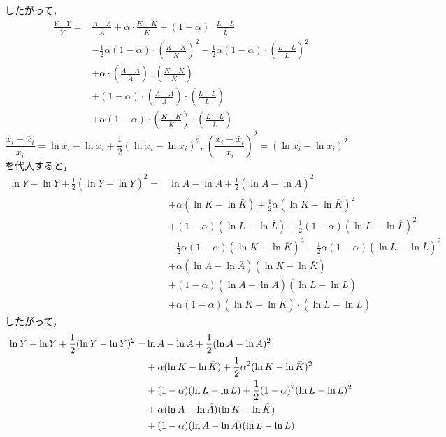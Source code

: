 \documentclass[a4paper,12pt,onecolumn,oneside,notitlepage,final]{article}
\begin{document}
\begin{enumerate}
したがって，
\begin{align*}
\frac{Y - \bar Y}{\bar Y} = &\frac{A-\bar A}{\bar A} + \alpha \cdot \frac{K-\bar K}{\bar K} + (1-\alpha) \cdot \frac{L-\bar L}{\bar L}\\
&-\frac{1}{2} \alpha (1-\alpha) \cdot \left(\frac{K-\bar K}{\bar K}\right)^2 - \frac{1}{2} \alpha(1-\alpha) \cdot \left(\frac{L-\bar L}{\bar L}\right)^2 \\
&+ \alpha \cdot \left(\frac{A - \bar A}{\bar A}\right) \cdot \left(\frac{K- \bar K}{\bar K}\right)\\
&+ (1-\alpha)\cdot \left(\frac{A-\bar A}{\bar A}\right) \cdot\left(\frac{L-\bar L}{\bar L}\right)\\
&+ \alpha (1-\alpha) \cdot \left(\frac{K-\bar K}{\bar K}\right) \cdot \left(\frac{L-\bar L}{\bar L}\right) 
\end{align*}
$\dfrac{x_i-\bar x_i}{\bar x_i} = \ln x_i - \ln \bar x_i + \dfrac{1}{2} (\ln x_i - \ln \bar x_i)^2$, $\left(\dfrac{x_i - \bar x_i}{\bar x_i}\right)^2 = (\ln x_i - \ln \bar x_i)^2$を代入すると，
\begin{align*}
\ln Y - \ln \bar Y + \frac{1}{2}(\ln Y - \ln \bar Y)^2 = &\ln A - \ln \bar A + \frac{1}{2} (\ln A - \ln \bar A)^2 \\
&+ \alpha (\ln K - \ln \bar K) + \frac{1}{2} \alpha (\ln K - \ln \bar K)^2 \\
&+ (1-\alpha) (\ln L - \ln \bar L) + \frac{1}{2} (1-\alpha) (\ln L - \ln \bar L)^2 \\
&-\frac{1}{2}\alpha(1-\alpha)(\ln K - \ln \bar K)^2 - \frac{1}{2}\alpha(1-\alpha) (\ln L - \ln \bar L)^2 \\
&+ \alpha (\ln A - \ln \bar A) (\ln K - \ln \bar K) \\
&+ (1-\alpha) (\ln A - \ln \bar A) (\ln L - \ln \bar L) \\
&+ \alpha (1-\alpha) (\ln K - \ln \bar K) \cdot (\ln L - \ln \bar L)
\end{align*}
したがって，
\begin{align}
\ln Y - \ln \bar Y + \frac{1}{2}(\ln Y - \ln \bar Y)^2 = &\ln A - \ln \bar A + \frac{1}{2} (\ln A - \ln \bar A)^2 \notag \\
&+ \alpha(\ln K - \ln \bar K) + \frac{1}{2}\alpha^2 (\ln K - \ln \bar K)^2 \notag \\
&+ (1-\alpha)(\ln L - \ln \bar L) + \frac{1}{2} (1-\alpha)^2(\ln L - \ln \bar L)^2 \notag \\
&+ \alpha (\ln A - \ln \bar A)(\ln K - \ln \bar K) \notag \\
&+ (1-\alpha) (\ln A - \ln \bar A) (\ln L - \ln \bar L) \notag \\

\end{align}
\end{enumerate}
\end{document}
